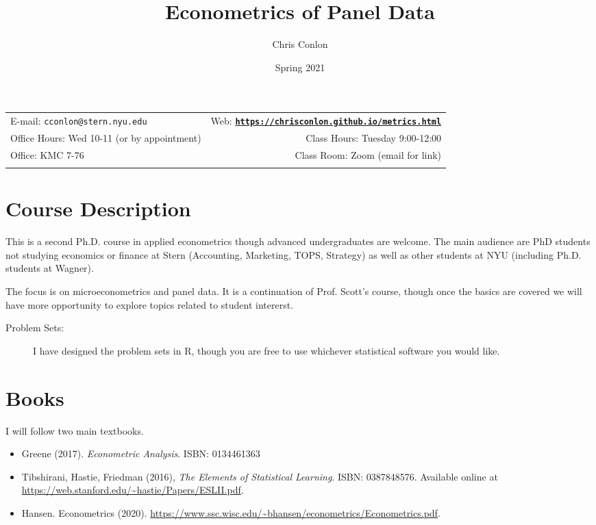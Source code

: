 \documentclass[11pt]{article}
\title{Econometrics of Panel Data}\author{Chris Conlon}
\date{Spring 2021}
\newcommand{\blankline}{\quad\pagebreak[2]}
\begin{document}
\maketitle

\blankline

\begin{tabular*}{.93\textwidth}{@{\extracolsep{\fill}}lr}


  E-mail: \texttt{cconlon@stern.nyu.edu} & Web: \href{http://chrisconlon.org}{\tt\bf https://chrisconlon.github.io/metrics.html}  \\

 Office Hours: Wed 10-11 (or by appointment) &  Class Hours: Tuesday 9:00-12:00 \\


 Office: KMC 7-76  & Class Room: Zoom (email for link) \\
&  \\
\hline
\end{tabular*}

\vspace{10 mm}

\section*{Course Description}
This is a second Ph.D. course in applied econometrics though advanced undergraduates are welcome. The main audience are PhD students not studying economics or finance at Stern (Accounting, Marketing, TOPS, Strategy) as well as other students at NYU (including Ph.D. students at Wagner).

The focus is on microeconometrics and panel data. It is a continuation of Prof. Scott's course, though once the basics are covered we will have more opportunity to explore topics related to student intererst. 

\begin{description}
\item[Problem Sets:] I have designed the problem sets in R, though you are free to use whichever statistical software you would like. 
\end{description}

\section*{Books}
I will follow two main textbooks.
\begin{itemize}
\item Greene (2017). \textit{Econometric Analysis}. ISBN: 0134461363
\item Tibshirani, Hastie, Friedman (2016), \textit{The Elements of Statistical Learning}. ISBN: 0387848576. Available online at \url{https://web.stanford.edu/~hastie/Papers/ESLII.pdf}.
\item Hansen. Econometrics (2020). \url{https://www.ssc.wisc.edu/~bhansen/econometrics/Econometrics.pdf}.
\end{itemize} 
\end{document}
